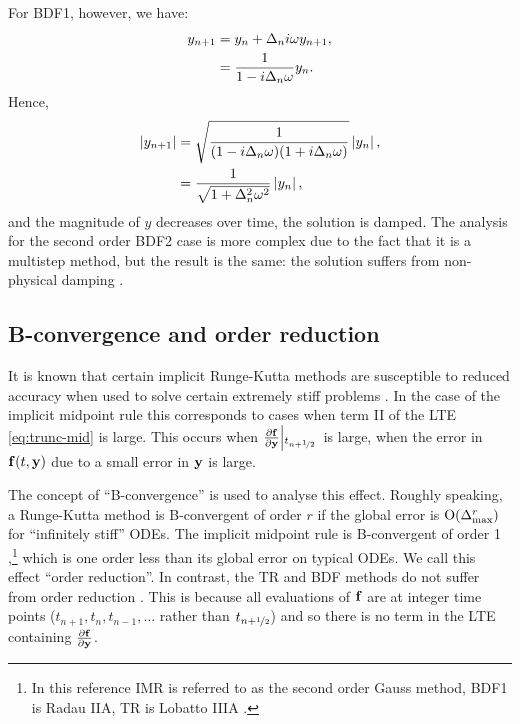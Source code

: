 For BDF1, however, we have:
\begin{equation}
  \begin{aligned}
    y_{n+1} &= y_n + \Delta_{n} i \omega y_{n+1}, \\
    &= \frac{1}{1 - i \Delta_{n} \omega} y_n.
  \end{aligned}
\end{equation}
Hence,
\begin{equation}
  \begin{aligned}
    \left|{y_{n+1}} \right| &= \sqrt{ \frac{1}{(1 - i \Delta_{n} \omega)(1 + i \Delta_{n} \omega)}} \left|{y_n} \right|, \\
    &= \frac{1}{\sqrt{1 + \Delta_{n}^2 \omega^2}} \left|{y_n} \right|, \\
  \end{aligned}
\end{equation}
and the magnitude of $y$ decreases over time, \ie the solution is damped.
The analysis for the second order BDF2 case is more complex due to the fact that it is a multistep method, but the result is the same: the solution suffers from non-physical damping \cite[265]{GreshoSani}.


\subsection{B-convergence and order reduction}
\label{sec:order-reduction}

It is known that certain implicit Runge-Kutta methods are susceptible to reduced accuracy when used to solve certain extremely stiff problems \cite[156]{Atkinson1994} \cite[225]{HairerWanner}.
In the case of the implicit midpoint rule this corresponds to cases when term II of the LTE \cref{eq:trunc-mid} is large.
This occurs when $\frac{\partial {\boldsymbol{\mathrm{f}}}}{\partial \boldsymbol{\mathrm{y}}}{\left|_{t_{n+\nicefrac{1}{2}}{}}\right.}$ is large, \ie when the error in ${\boldsymbol{\mathrm{f}}{\left( t, \boldsymbol{\mathrm{y}} \right)}}$ due to a small error in $\boldsymbol{\mathrm{y}}$ is large.

The concept of ``B-convergence'' is used to analyse this effect.
Roughly speaking, a Runge-Kutta method is B-convergent of order $r$ if the global error is $\mathrm{O}{\left( \Delta_{\text{max}}^r \right)}$ for ``infinitely stiff'' ODEs.
The implicit midpoint rule is B-convergent of order 1 \cite[231]{HairerWanner},\footnote{In this reference IMR is referred to as the second order Gauss method, BDF1 is Radau IIA, TR is Lobatto IIIA \cite[72-76]{HairerWanner}.} which is one order less than its global error on typical ODEs.
We call this effect ``order reduction''.
In contrast, the TR and BDF methods do not suffer from order reduction \cite[159]{Atkinson1994}.
This is because all evaluations of ${\boldsymbol{\mathrm{f}}}$ are at integer time points (\ie $t_{n+1}, t_{n}, t_{n-1}, \ldots$ rather than $t_{n+\nicefrac{1}{2}}$) and so there is no term in the LTE containing $\frac{\partial {\boldsymbol{\mathrm{f}}}}{\partial \boldsymbol{\mathrm{y}}}$.

